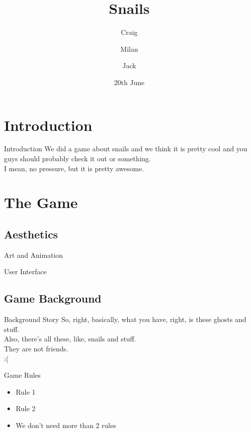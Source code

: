 \documentclass{beamer}
\title{Snails}
\author{Craig \and Milan \and Jack}
\date{20th June}
\begin{document}
\begin{frame}
  \titlepage
\end{frame}

\section{Introduction}

\begin{frame}{Introduction}
  We did a game about snails and we think it is pretty cool and you guys should probably check it out or something. \\
  \vspace{\baselineskip}
  I mean, no pressure, but it is pretty awesome.
\end{frame}


\section{The Game}
\subsection{Aesthetics}

\begin{frame}{Art and Animation}
\end{frame}

\begin{frame}{User Interface}
\end{frame}

\subsection{Game Background}

\begin{frame}{Background Story}
  So, right, basically, what you have, right, is these ghosts and stuff. \\
  \vspace{\baselineskip}
  Also, there's all these, like, snails and stuff. \\
  \vspace{\baselineskip}
  They are not friends. \\
  \vspace{\baselineskip}
  :(
\end{frame}

\begin{frame}{Game Rules}
  \begin{itemize}
    \item Rule 1
    \item Rule 2
    \item We don't need more than 2 rules
  \end{itemize}
\end{frame}
\end{document}
